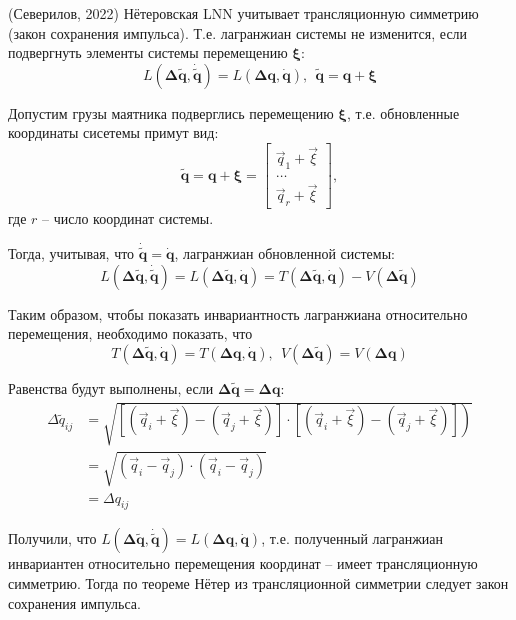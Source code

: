\documentclass[12pt]{article}
\begin{document}
\begin{Theorem} (Северилов, 2022)
	Нётеровская LNN учитывает трансляционную симметрию (закон сохранения импульса). Т.е. лагранжиан системы не изменится, если подвергнуть элементы системы перемещению $\bm{\xi}$: 
$$L(\mathbf{\Delta \tilde{q}} , \mathbf{{\dot{\tilde{q}}}} ) = L(\mathbf{\Delta q}, \mathbf{\dot{q}}), ~~\mathbf{\tilde{q}} = \mathbf{q} + \bm{\xi}$$

\end{Theorem}
\begin{Proof}
	Допустим грузы маятника подверглись перемещению $\bm{\xi}$, т.е. обновленные координаты сисетемы примут вид:
	$$\mathbf{\tilde{q}} = \mathbf{q} + \bm{\xi} = \begin{bmatrix}\vec{q}_1 + \vec{\xi} \\\dots\\\vec{q}_r + \vec{\xi}\end{bmatrix},$$ где $r$ -- число координат системы. 
	
	Тогда, учитывая, что $\mathbf{{\dot{\tilde{q}}}}  = \mathbf{\dot{q}}$, лагранжиан обновленной системы:
	$$L(\mathbf{\Delta \tilde{q}}, \mathbf{\dot{\tilde{q}}}) = L(\mathbf{\Delta \tilde{q}}, \mathbf{\dot{q}})  = T(\mathbf{\Delta \tilde{q}}, \mathbf{\dot{q}}) - V(\mathbf{\Delta \tilde{q}})$$
	
	Таким образом, чтобы показать инвариантность лагранжиана относительно перемещения, необходимо показать, что
	$$T(\mathbf{\Delta \tilde{q}}, \mathbf{\dot{q}}) = T(\mathbf{\Delta q}, \mathbf{\dot{q}}),~~ V(\mathbf{\Delta \tilde{q}}) = V(\mathbf{\Delta q})$$
	
	Равенства будут выполнены, если $\mathbf{\Delta \tilde{q}} = \mathbf{\Delta q}$:
	$$\begin{aligned} 
	\Delta \tilde{q}_{i j} &=\sqrt{\left.\left[\left(\vec{q}_{i}+\vec{\xi}\right)-\left(\vec{q}_{j}+\vec{\xi}\right)\right] \cdot\left[\left(\vec{q}_{i}+\vec{\xi}\right)-\left(\vec{q}_{j}+\vec{\xi}\right)\right]\right)} \\ &=\sqrt{\left(\vec{q}_{i}-\vec{q}_{j}\right) \cdot\left(\vec{q}_{i}-\vec{q}_{j}\right)} \\ &= \Delta q_{i j} 
	\end{aligned}$$
	
	Получили, что $L(\mathbf{\Delta \tilde{q}}, \mathbf{\dot{\tilde{q}}}) = L(\mathbf{\Delta q}, \mathbf{\dot{q}})$, т.е. полученный лагранжиан инвариантен относительно перемещения координат -- имеет трансляционную симметрию. Тогда по теореме Нётер из трансляционной симметрии следует закон сохранения импульса.
	
\end{Proof}
\end{document}
